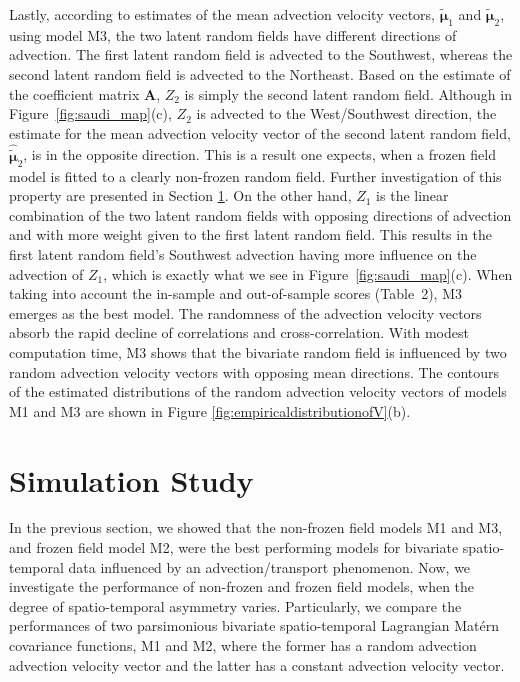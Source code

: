 \documentclass[12pt]{article}
\newcommand{\0}{\mathbf{0}}
\begin{document}
Lastly, according to estimates of the mean advection velocity vectors, $\tilde{\boldsymbol{\mu}}_1$ and $\tilde{\boldsymbol{\mu}}_2$, using model M3, the two latent random fields have different directions of advection. The first latent random field is advected to the Southwest, whereas the second latent random field is advected to the Northeast. Based on the estimate of the coefficient matrix $\mathbf{A}$, $Z_2$ is simply the second latent random field. Although in Figure~\ref{fig:saudi_map}(c), $Z_2$ is advected to the West/Southwest direction, the estimate for the mean advection velocity vector of the second latent random field, $\hat{\tilde{\boldsymbol{\mu}}}_2$, is in the opposite direction. This is a result one expects, when a frozen field model is fitted to a clearly non-frozen random field. Further investigation of this property are presented in Section \ref{sec:simulation}. On the other hand, $Z_1$ is the linear combination of the two latent random fields with opposing directions of advection and with more weight given to the first latent random field. This results in the first latent random field's Southwest advection having more influence on the advection of $Z_1$, which is exactly what we see in Figure~\ref{fig:saudi_map}(c). When taking into account the in-sample and out-of-sample scores (Table~2), M3 emerges as the best model. The randomness of the advection velocity vectors absorb the rapid decline of correlations and cross-correlation. With modest computation time, M3 shows that the bivariate random field is influenced by two random advection velocity vectors with opposing mean directions. The contours of the estimated distributions of the random advection velocity vectors of models M1 and M3 are shown in Figure \ref{fig:empiricaldistributionofV}(b).



\section{Simulation Study}\label{sec:simulation}

In the previous section, we showed that the non-frozen field models M1 and M3, and frozen field model M2, were the best performing models for bivariate spatio-temporal data influenced by an advection/transport phenomenon. Now, we investigate the performance of non-frozen and frozen field models, when the degree of spatio-temporal asymmetry varies. Particularly, we compare the performances of two parsimonious bivariate spatio-temporal Lagrangian Mat\'{e}rn covariance functions, M1 and M2, where the former has a random advection advection velocity vector and the latter has a constant advection velocity vector.
\end{document}

